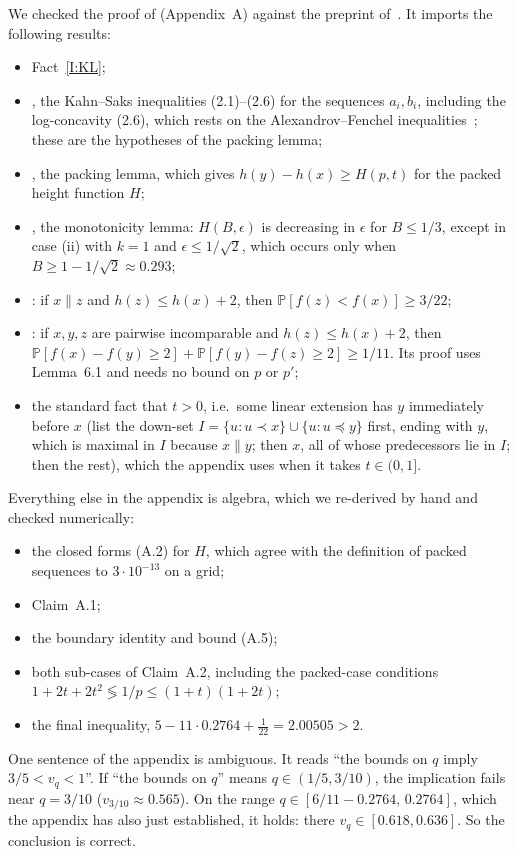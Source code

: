 \documentclass[10pt]{amsart}
\theoremstyle{definition}
\theoremstyle{remark}
\newcommand{\PP}{\mathbb{P}}
\newcommand{\inc}{\parallel}
\begin{document}
We checked the proof of \cite[Lemma~2.3]{KSBFT} (Appendix~A) against the preprint of~\cite{BFT95}.
It imports the following results:
\begin{itemize}
\item Fact~\ref{I:KL};
\item \cite[Lemma~2.1]{BFT95}, the Kahn--Saks inequalities (2.1)--(2.6) for the sequences $a_i,b_i$, including the log-concavity (2.6), which rests on the Alexandrov--Fenchel inequalities~\cite{KS84}; these are the hypotheses of the packing lemma;
\item \cite[Lemma~2.2]{BFT95}, the packing lemma, which gives $h(y)-h(x)\ge H(p,t)$ for the packed height function $H$;
\item \cite[Lemma~2.3]{BFT95}, the monotonicity lemma: $H(B,\epsilon)$ is decreasing in $\epsilon$ for $B\le1/3$, except in case (ii) with $k=1$ and $\epsilon\le1/\sqrt2$, which occurs only when $B\ge 1-1/\sqrt2\approx0.293$;
\item \cite[Lemma~6.1]{BFT95}: if $x\inc z$ and $h(z)\le h(x)+2$, then $\PP[f(z)<f(x)]\ge3/22$;
\item \cite[Lemma~6.2]{BFT95}: if $x,y,z$ are pairwise incomparable and $h(z)\le h(x)+2$, then $\PP[f(x)-f(y)\ge2]+\PP[f(y)-f(z)\ge2]\ge1/11$. Its proof uses Lemma~6.1 and needs no bound on $p$ or $p'$;
\item the standard fact that $t>0$, i.e.\ some linear extension has $y$ immediately before $x$ (list the down-set $I=\{u: u\prec x\}\cup\{u:u\preceq y\}$ first, ending with $y$, which is maximal in $I$ because $x\inc y$; then $x$, all of whose predecessors lie in $I$; then the rest), which the appendix uses when it takes $t\in(0,1]$.
\end{itemize}
Everything else in the appendix is algebra, which we re-derived by hand and checked numerically:
\begin{itemize}
\item the closed forms (A.2) for $H$, which agree with the definition of packed sequences to $3\cdot10^{-13}$ on a grid;
\item Claim~A.1;
\item the boundary identity and bound (A.5);
\item both sub-cases of Claim~A.2, including the packed-case conditions $1+2t+2t^2\lessgtr 1/p\le(1+t)(1+2t)$;
\item the final inequality, $5-11\cdot0.2764+\tfrac1{22}=2.00505>2$.
\end{itemize}
One sentence of the appendix is ambiguous. It reads ``the bounds on $q$ imply $3/5<v_q<1$''. If ``the bounds on $q$'' means $q\in(1/5,3/10)$, the implication fails near $q=3/10$ ($v_{3/10}\approx0.565$). On the range $q\in[6/11-0.2764,\,0.2764]$, which the appendix has also just established, it holds: there $v_q\in[0.618,0.636]$. So the conclusion is correct.
\end{document}
